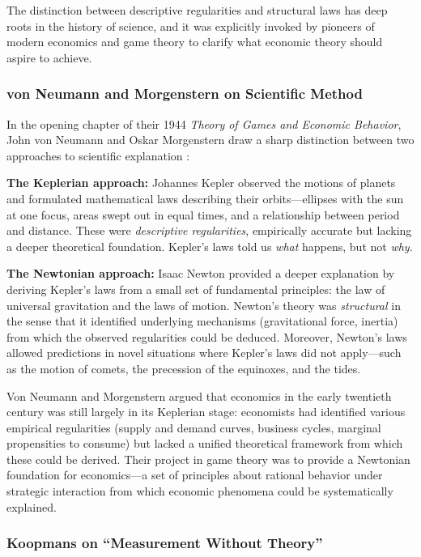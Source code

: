 \documentclass[12pt]{article}
\begin{document}
The distinction between descriptive regularities and structural laws has deep roots in the history of science, and it was explicitly invoked by pioneers of modern economics and game theory to clarify what economic theory should aspire to achieve.

\subsubsection{von Neumann and Morgenstern on Scientific Method}

In the opening chapter of their 1944 \emph{Theory of Games and Economic Behavior}, John von Neumann and Oskar Morgenstern draw a sharp distinction between two approaches to scientific explanation \cite{vonNeumannMorgenstern1944}:

\textbf{The Keplerian approach:} Johannes Kepler observed the motions of planets and formulated mathematical laws describing their orbits---ellipses with the sun at one focus, areas swept out in equal times, and a relationship between period and distance. These were \emph{descriptive regularities}, empirically accurate but lacking a deeper theoretical foundation. Kepler's laws told us \emph{what} happens, but not \emph{why}.

\textbf{The Newtonian approach:} Isaac Newton provided a deeper explanation by deriving Kepler's laws from a small set of fundamental principles: the law of universal gravitation and the laws of motion. Newton's theory was \emph{structural} in the sense that it identified underlying mechanisms (gravitational force, inertia) from which the observed regularities could be deduced. Moreover, Newton's laws allowed predictions in novel situations where Kepler's laws did not apply---such as the motion of comets, the precession of the equinoxes, and the tides.

Von Neumann and Morgenstern argued that economics in the early twentieth century was still largely in its Keplerian stage: economists had identified various empirical regularities (supply and demand curves, business cycles, marginal propensities to consume) but lacked a unified theoretical framework from which these could be derived. Their project in game theory was to provide a Newtonian foundation for economics---a set of principles about rational behavior under strategic interaction from which economic phenomena could be systematically explained.

\subsubsection{Koopmans on ``Measurement Without Theory''}
\end{document}
